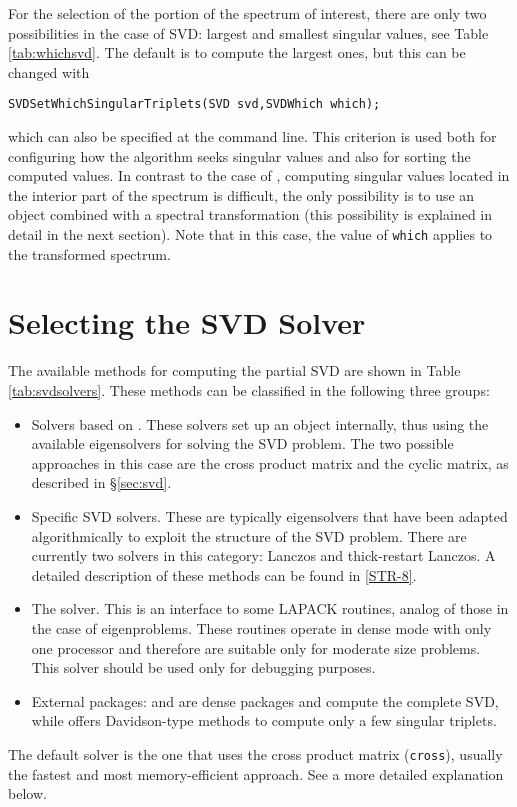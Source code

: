 	For the selection of the portion of the spectrum of interest, there are only two possibilities in the case of SVD: largest and smallest singular values, see Table \ref{tab:whichsvd}. The default is to compute the largest ones, but this can be changed with
	\begin{Verbatim}[fontsize=\small]
	SVDSetWhichSingularTriplets(SVD svd,SVDWhich which);
	\end{Verbatim}
which can also be specified at the command line. This criterion is used both for configuring how the algorithm seeks singular values and also for sorting the computed values. In contrast to the case of , computing singular values located in the interior part of the spectrum is difficult, the only possibility is to use an  object combined with a spectral transformation (this possibility is explained in detail in the next section). Note that in this case, the value of \Verb!which! applies to the transformed spectrum.

\section{Selecting the SVD Solver}

The available methods for computing the partial SVD are shown in Table \ref{tab:svdsolvers}. These methods can be classified in the following three groups:
\begin{itemize}
\item Solvers based on . These solvers set up an  object internally, thus using the available eigensolvers for solving the SVD problem. The two possible approaches in this case are the cross product matrix and the cyclic matrix, as described in \S\ref{sec:svd}.
\item Specific SVD solvers. These are typically eigensolvers that have been adapted algorithmically to exploit the structure of the SVD problem. There are currently two solvers in this category: Lanczos and thick-restart Lanczos. A detailed description of these methods can be found in \hyperlink{str}{[STR-8]}.
\item The \lapack solver. This is an interface to some LAPACK routines, analog of those in the case of eigenproblems. These routines operate in dense mode with only one processor and therefore are suitable only for moderate size problems. This solver should be used only for debugging purposes.
\item External packages: \scalapack and \elemental are dense packages and compute the complete SVD, while \primme offers Davidson-type methods to compute only a few singular triplets.
\end{itemize}
The default solver is the one that uses the cross product matrix (\texttt{cross}), usually the fastest and most memory-efficient approach. See a more detailed explanation below.

